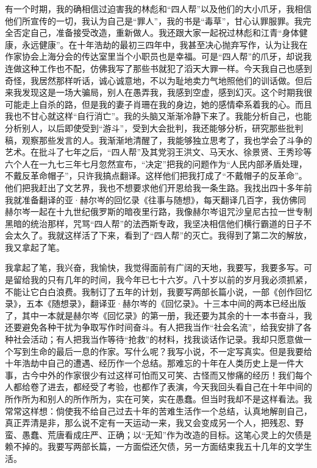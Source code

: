 \par 有一个时期，我的确相信过迫害我的林彪和“四人帮”以及他们的大小爪牙，我相信他们所宣传的一切，我认为自己是“罪人”，我的书是“毒草”，甘心认罪服罪。我完全否定自己，准备接受改造，重新做人。我还跟大家一起祝过林彪和江青“身体健康，永远健康”。在十年浩劫的最初三四年中，我甚至决心抛弃写作，认为让我在作家协会上海分会的传达室里当个小职员也是幸福。可是“四人帮”的爪牙，却说我连做这种工作也不配，仿佛我写了那些书就犯了滔天大罪一样。今天我自己也感到奇怪，我居然那样听话，诚心诚意地，不以为耻地卖力气地照他们的训话做。但后来我发现这是一场大骗局，别人在愚弄我，我感到空虚，感到幻灭。这个时期我很可能走上自杀的路，但是我的妻子肖珊在我的身边，她的感情牵系着我的心。而且我也不甘心就这样“自行消亡”。我的头脑又渐渐冷静下来了。我能分析自己，也能分析别人，以后即使受到“游斗”，受到大会批判，我还能够分析，研究那些批判稿，观察那些发言的人。我渐渐地清醒了，我能够独立思考了，我也学会了斗争的艺术。在批斗了七年之后，“四人帮”及其党羽王洪文、马天水、徐景贤、王秀珍等六个人在一九七三年七月忽然宣布，“决定”把我的问题作为“人民内部矛盾处理，不戴反革命帽子”，只许我搞点翻译。这样他们把我打成了“不戴帽子的反革命”。他们把我赶出了文艺界，我也不想要求他们开恩给我一条生路。我找出四十多年前我就准备翻译的亚·赫尔岑的回忆录《往事与随想》，每天翻译几百字，我仿佛同赫尔岑一起在十九世纪俄罗斯的暗夜里行路，我像赫尔岑诅咒沙皇尼古拉一世专制黑暗的统治那样，咒骂“四人帮”的法西斯专政，我坚决相信他们横行霸道的日子不会太久了。我就这样活了下来，看到了“四人帮”的灭亡。我得到了第二次的解放，我又拿起了笔。
\par 我拿起了笔，我兴奋，我愉快，我觉得面前有广阔的天地，我要写，我要多写。可是留给我的只有几年的时间，我今年已七十六岁。八十岁以前的岁月我必须抓紧，不能让它白白浪费。我制订了五年的计划，我要写两部长篇小说，一部《创作回忆录》，五本《随想录》，翻译亚·赫尔岑的《回忆录》。十三本中间的两本已经出版了，其中一本就是赫尔岑《回忆录》的第一册，我还要为其余的十一本书奋斗，我还要避免各种干扰为争取写作时间奋斗。有人把我当作“社会名流”，给我安排了各种社会活动；有人把我当作等待“抢救”的材料，找我谈话作记录。我却只愿意做一个写到生命的最后一息的作家。写什么呢？我写小说，不一定写真实。但是我要给十年浩劫中自己的遭遇、经历作一个总结。那难忘的十年在人类历史上是一件大事，古今中外的作家很少有过这样可怕而又可笑、古怪而又惨痛的经历！我们每个人都给卷了进去，都经受了考验，也都作了表演，今天我回头看自己在十年中间的所作所为和别人的所作所为，实在可笑，实在愚蠢。但当时我却不是这样看法。我常常这样想：倘使我不给自己过去十年的苦难生活作一个总结，认真地解剖自己，真正弄清是非，那么说不定有一天运动一来，我又会变成另一个人，把残忍、野蛮、愚蠢、荒唐看成庄严、正确；以“无知”作为改造的目标。这笔心灵上的欠债是赖不掉的。我要写两部长篇，一方面偿还欠债，另一方面结束我五十几年的文学生活。
